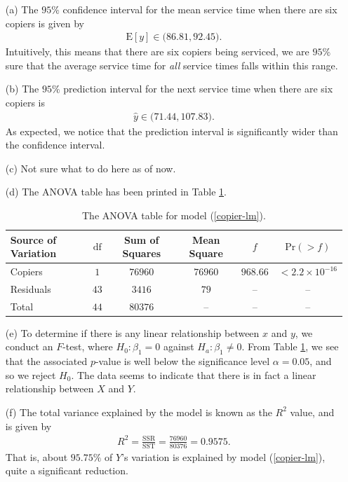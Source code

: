 \documentclass[10pt]{article}
\begin{document}
\begin{itemize}
    \item[(a)] The \(95\%{}\) confidence interval for the mean service time when there are six copiers is given by 
    \begin{align*}
        \mathrm{E}[y] \in \big(86.81, 92.45 \big).
    \end{align*}
    Intuitively, this means that there are six copiers being serviced, we are \(95\%{}\) sure that the average service time for 
    \textsl{all} service times falls within this range. 
    \item[(b)] The \(95\%{}\) prediction interval for the next service time when there are six copiers is 
    \begin{align*}
        \hat{y} \in \big( 71.44, 107.83 \big).
    \end{align*}
    As expected, we notice that the prediction interval is significantly wider than the confidence interval. 
    \item[(c)] Not sure what to do here as of now. 
    \item[(d)] The ANOVA table has been printed in Table \ref{copier-anova}.
    \begin{table}
        \centering
        \def\arraystretch{1.25}
        \begin{tabular}[ht]{lccccc} \toprule
            Source of Variation & \(\mathrm{df}\) & Sum of Squares & Mean Square & \(f\) & \(\mathrm{Pr}(> f)\) \\\midrule
            Copiers & \(1\) & \(76960\) & \(76960\) & \(968.66\) & \(< 2.2 \times 10^{-16}\) \\
            Residuals & \(43\) & \(3416\) & \(79\) & -- & -- \\
            Total & \(44\) & \(80376\) & -- & -- & -- \\\bottomrule
        \end{tabular}
        \caption{The ANOVA table for model (\ref{copier-lm}).}
        \label{copier-anova}
    \end{table}
    \item[(e)] To determine if there is any linear relationship between \(x\) and \(y\), we conduct an \(F\)-test, where 
    \(H_0 : \beta_1 = 0\) against \(H_a : \beta_1 \neq 0\). From Table \ref{copier-anova}, we see that the associated \(p\)-value is 
    well below the significance level \(\alpha = 0.05\), and so we reject \(H_0\). The data seems to indicate that there is in fact a 
    linear relationship between \(X\) and \(Y\).
    \item[(f)] The total variance explained by the model is known as the \(R^2\) value, and is given by
    \begin{align*}
        R^2 = \frac{\mathrm{SSR}}{\mathrm{SST}} = \frac{76960}{80376} = 0.9575.
    \end{align*}
    That is, about \(95.75\%{}\) of \(Y\)'s variation is explained by model (\ref{copier-lm}), quite a significant reduction. 
\end{itemize}
\end{document}
